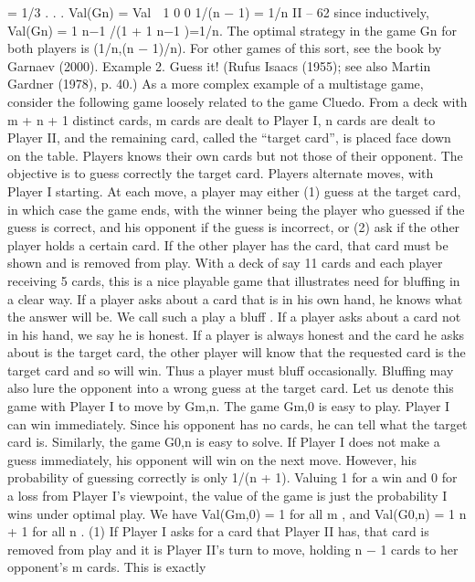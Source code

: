 \documentclass[]{report}
\begin{document}
= 1/3
.
.
.
Val(Gn) = Val  1 0
0 1/(n − 1)
= 1/n
II – 62
since inductively, Val(Gn) = 1
n−1 /(1 + 1
n−1 )=1/n. The optimal strategy in the game Gn
for both players is (1/n,(n − 1)/n). For other games of this sort, see the book by Garnaev
(2000).
Example 2. Guess it! (Rufus Isaacs (1955); see also Martin Gardner (1978), p. 40.) As
a more complex example of a multistage game, consider the following game loosely related
to the game Cluedo. From a deck with m + n + 1 distinct cards, m cards are dealt to
Player I, n cards are dealt to Player II, and the remaining card, called the “target card”,
is placed face down on the table. Players knows their own cards but not those of their
opponent. The objective is to guess correctly the target card. Players alternate moves,
with Player I starting. At each move, a player may either
(1) guess at the target card, in which case the game ends, with the winner being the player
who guessed if the guess is correct, and his opponent if the guess is incorrect, or
(2) ask if the other player holds a certain card. If the other player has the card, that card
must be shown and is removed from play.
With a deck of say 11 cards and each player receiving 5 cards, this is a nice playable
game that illustrates need for bluffing in a clear way. If a player asks about a card that is
in his own hand, he knows what the answer will be. We call such a play a bluff . If a player
asks about a card not in his hand, we say he is honest. If a player is always honest and
the card he asks about is the target card, the other player will know that the requested
card is the target card and so will win. Thus a player must bluff occasionally. Bluffing
may also lure the opponent into a wrong guess at the target card.
Let us denote this game with Player I to move by Gm,n. The game Gm,0 is easy to
play. Player I can win immediately. Since his opponent has no cards, he can tell what the
target card is. Similarly, the game G0,n is easy to solve. If Player I does not make a guess
immediately, his opponent will win on the next move. However, his probability of guessing
correctly is only 1/(n + 1). Valuing 1 for a win and 0 for a loss from Player I’s viewpoint,
the value of the game is just the probability I wins under optimal play. We have
Val(Gm,0) = 1 for all m , and Val(G0,n) = 1
n + 1
for all n . (1)
If Player I asks for a card that Player II has, that card is removed from play and it is
Player II’s turn to move, holding n − 1 cards to her opponent’s m cards. This is exactly
\end{document}
